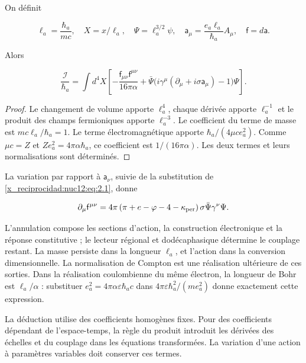 On définit



\[
\ell_a=\frac{\hbar_a}{mc},\quad X=x/\ell_a,\quad
\Psi=\ell_a^{3/2}\psi,\quad
\mathsf a_\mu=\frac{e_a\ell_a}{\hbar_a}A_\mu,\quad
\mathsf f=d\mathsf a.
\]



Alors



\begin{equation}
\boxed{\frac{\mathcal I}{\hbar_a}=
\int d^4X\left[
-\frac{\mathsf f_{\mu\nu}\mathsf f^{\mu\nu}}{16\pi\alpha}
+\bar\Psi\bigl(i\gamma^\mu(\partial_\mu+i\sigma\mathsf a_\mu)-1\bigr)\Psi
\right].}
\label{x_reciprocidad:nuc12:eq:3.3}
\end{equation}



\begin{proof}
Le changement de volume apporte \(\ell_a^4\), chaque dérivée apporte \(\ell_a^{-1}\) et le produit des champs fermioniques apporte \(\ell_a^{-3}\). Le coefficient du terme de masse est \(mc\ell_a/\hbar_a=1\). Le terme électromagnétique apporte \(\hbar_a/(4\mu c e_a^2)\). Comme \(\mu c=Z\) et \(Ze_a^2=4\pi\alpha\hbar_a\), ce coefficient est \(1/(16\pi\alpha)\). Les deux termes et leurs normalisations sont déterminés.
\end{proof}

La variation par rapport à \(\mathsf a_\nu\), suivie de la substitution de \eqref{x_reciprocidad:nuc12:eq:2.1}, donne



\begin{equation}
\partial_\mu\mathsf f^{\mu\nu}
=4\pi\left(\pi+e-\varphi-4-\kappa_{\rm per}\right)
\sigma\bar\Psi\gamma^\nu\Psi .
\label{x_reciprocidad:nuc12:eq:3.4}
\end{equation}



L’annulation compose les sections d’action, la construction électronique et la réponse constitutive ; le lecteur régional et dodécaphasique détermine le couplage restant. La masse persiste dans la longueur \(\ell_a\), et l’action dans la conversion dimensionnelle. La normalisation de Compton est une réalisation ultérieure de ces sorties. Dans la réalisation coulombienne du même électron, la longueur de Bohr est \(\ell_a/\alpha\) : substituer \(e_a^2=4\pi\alpha\varepsilon\hbar_a c\) dans \(4\pi\varepsilon\hbar_a^2/(m e_a^2)\) donne exactement cette expression.

La déduction utilise des coefficients homogènes fixes. Pour des coefficients dépendant de l’espace-temps, la règle du produit introduit les dérivées des échelles et du couplage dans les équations transformées. La variation d’une action à paramètres variables doit conserver ces termes.

